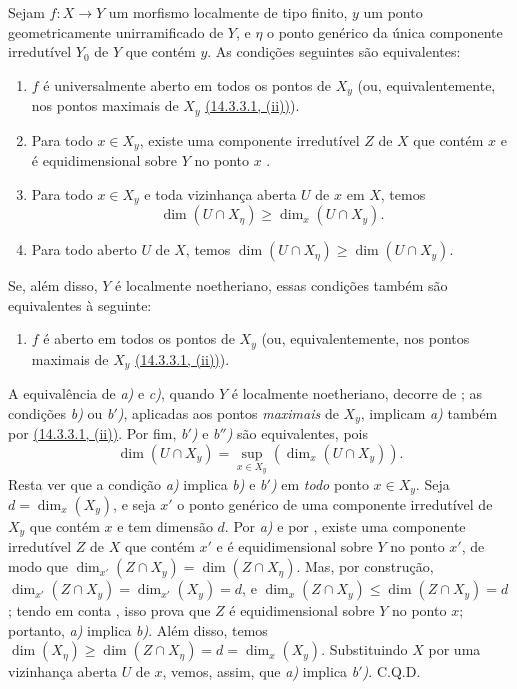 \begin{corollary}[14.4.2]
\label{IV.14.4.2}
Sejam $f:X\to Y$ um morfismo localmente de tipo finito, $y$ um ponto geometricamente unirramificado de $Y$, e $\eta$ o ponto genérico da única componente irredutível $Y_0$ de $Y$ que contém $y$.
As condições seguintes são equivalentes:
\begin{enumerate}[label=\emph{\alph*)}]
  \item $f$ é universalmente aberto em todos os pontos de $X_y$ (ou, equivalentemente, nos pontos maximais de $X_y$ {\hyperlink{ega4.c04.subsec.14-3-3-1}{(14.3.3.1, (ii))}}).
  \item Para todo $x\in X_y$, existe uma componente irredutível $Z$ de $X$ que contém $x$ e é equidimensional sobre $Y$ no ponto $x$ .
  \item[\emph{b$'$)}] Para todo $x\in X_y$ e toda vizinhança aberta $U$ de $x$ em $X$, temos
    \[
      \dim(U\cap X_\eta)\geq\dim_x(U\cap X_y).
    \]
  \item[\emph{b$''$)}] Para todo aberto $U$ de $X$, temos $\dim(U\cap X_\eta)\geq\dim(U\cap X_y)$.
\end{enumerate}


Se, além disso, $Y$ é localmente noetheriano, essas condições também são equivalentes à seguinte:
\begin{enumerate}[label=\emph{\alph*)}]
  \item[\emph{c)}] $f$ é aberto em todos os pontos de $X_y$ (ou, equivalentemente, nos pontos maximais de $X_y$ {\hyperlink{ega4.c04.subsec.14-3-3-1}{(14.3.3.1, (ii))}}).
\end{enumerate}
\end{corollary}

A equivalência de \emph{a)} e \emph{c)}, quando $Y$ é localmente noetheriano, decorre de ; as condições \emph{b)} ou \emph{b$'$)}, aplicadas aos pontos \emph{maximais} de $X_y$, implicam \emph{a)} também por {\hyperlink{ega4.c04.subsec.14-3-3-1}{(14.3.3.1, (ii))}}.
Por fim, \emph{b$'$)} e \emph{b$''$)} são equivalentes, pois
\[
  \dim(U\cap X_y)=\sup_{x\in X_y}(\dim_x(U\cap X_y)).
\]
Resta ver que a condição \emph{a)} implica \emph{b)} e \emph{b$'$)} em \emph{todo} ponto $x\in X_y$.
Seja $d=\dim_x(X_y)$, e seja $x'$ o ponto genérico de uma componente irredutível de $X_y$ que contém $x$ e tem dimensão $d$.
Por \emph{a)} e por , existe uma componente irredutível $Z$ de $X$ que contém $x'$ e é equidimensional sobre $Y$ no ponto $x'$, de modo que $\dim_{x'}(Z\cap X_y)=\dim(Z\cap X_\eta)$.
Mas, por construção, $\dim_{x'}(Z\cap X_y)=\dim_{x'}(X_y)=d$, e $\dim_x(Z\cap X_y)\leq\dim(Z\cap X_y)=d$; tendo em conta , isso prova que $Z$ é equidimensional sobre $Y$ no ponto $x$; portanto, \emph{a)} implica \emph{b)}.
Além disso, temos $\dim(X_\eta)\geq\dim(Z\cap X_\eta)=d=\dim_x(X_y)$.
Substituindo $X$ por uma vizinhança aberta $U$ de $x$, vemos, assim, que \emph{a)} implica \emph{b$'$)}.
C.Q.D.

